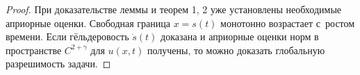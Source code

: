 \begin{proof} При доказательстве леммы  и теорем 1, 2 уже установлены необходимые априорные оценки. 
Свободная граница $x=s(t)$ монотонно возрастает с~ростом времени. Если гёльдеровость $\dot{s}(t)$ доказана и априорные оценки норм в пространстве $C^{2+\gamma}$ для $u(x,t)$ получены, то можно доказать глобальную разрешимость задачи. \end{proof}




